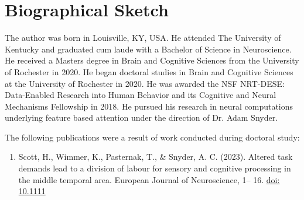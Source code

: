 



\chapter*{\color{thesisBlue} Biographical Sketch}

The author was born in Louisville, KY, USA. He attended The University of Kentucky and graduated cum laude with a Bachelor of Science in Neuroscience. He received a Masters degree in Brain and Cognitive Sciences from the University of Rochester in 2020. He began doctoral studies in Brain and Cognitive Sciences at the University of Rochester in 2020. He was awarded the NSF NRT-DESE: Data-Enabled Research into Human Behavior and its Cognitive and Neural
Mechanisms Fellowship in 2018. He pursued his research in neural computations underlying feature based attention under the direction of Dr. Adam Snyder.

The following publications were a result of work conducted during doctoral study:

\begin{enumerate}
	\item Scott, H., Wimmer, K., Pasternak, T., \& Snyder, A. C. (2023). Altered task demands lead to a division of labour for sensory and cognitive processing in the middle temporal area. European Journal of Neuroscience, 1– 16. \href{https://doi.org/10.1111/ejn.15964}{doi: 10.1111}
\end{enumerate}



